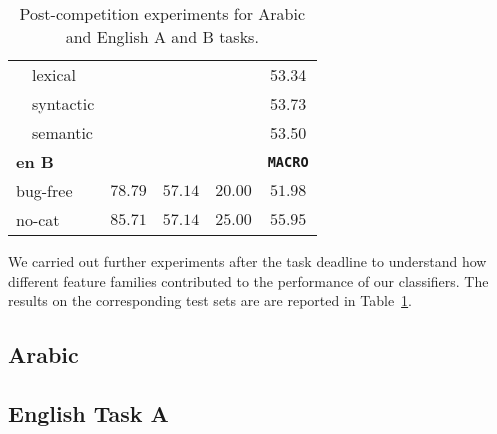 \begin{table}
\begin{tabular}{|l|cccc|}
 \,\,\,\, lexical&	&	&	& 53.34	\\
 \,\,\,\, syntactic&	&	&	& 53.73	 \\
 \,\,\,\, semantic&	&	&	& 53.50	 \\   
  \hline
  \hline
  \bf en B	& \bf \yes & \bf \no & \bf \unsure & \bf \texttt{MACRO}	 \\
 \hline
 bug-free	& $78.79$	& $57.14$	& $20.00$	& $51.98$ \\
 no-cat		& $85.71$	& $57.14$	& $25.00$ 	& $55.95$ \\
 \hline
 \end{tabular}
 \caption{Post-competition experiments for Arabic and English A and B tasks. 
\label{tab:aftertask}}
\end{table}

We carried out further experiments after the task deadline to understand how 
different feature families contributed to the performance of our classifiers. 
The results on the corresponding test sets are are reported in 
Table~\ref{tab:aftertask}.



\subsection{Arabic} \label{sec:discussionArabic}




\subsection{English Task A} \label{sec:discussiona}

